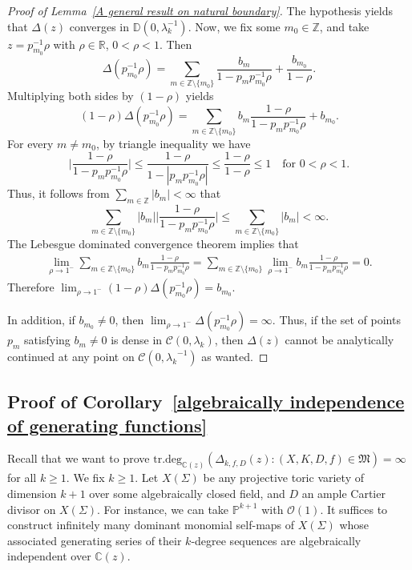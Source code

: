 \documentclass[11pt,a4paper]{article}
\theoremstyle{plain}
\theoremstyle{remark}
\theoremstyle{custombold}
\begin{document}
\begin{proof}[Proof of Lemma~\ref{A general result on natural boundary}]
   The hypothesis yields that $\Delta(z)$ converges in $\mathbb D(0,\lambda_k^{-1})$. Now, we fix some $m_0\in\mathbb Z$, and take $z= p_{m_0}^{-1}\rho$ with $\rho\in\mathbb R$, $0<\rho<1$. Then 
$$\Delta(p_{m_0}^{-1}\rho)=\sum_{m\in\mathbb Z\setminus\{m_0\}}\frac{b_m}{1-p_mp_{m_0}^{-1}\rho}+\frac{b_{m_0}}{1-\rho}.$$
Multiplying both sides by $(1-\rho)$ yields
$$(1-\rho)\Delta(p_{m_0}^{-1}\rho)=\sum_{m\in\mathbb Z\setminus\{m_0\}}{b_m}\frac{1-\rho}{1-p_mp_{m_0}^{-1}\rho}+b_{m_0}.$$
For every $m\neq m_0$, by triangle inequality we have $$\Bigg|\frac{1-\rho}{1-p_mp_{m_0}^{-1}\rho}\Bigg|\leq \frac{1-\rho}{1-|p_mp_{m_0}^{-1}\rho|}\leq\frac{1-\rho}{1-\rho}\leq 1\text{ }\text{ for }0<\rho<1.$$
Thus, it follows from $\sum_{m\in\mathbb Z}|b_m|<\infty$ that 
$$\sum_{m\in\mathbb Z\setminus\{m_0\}}{|b_m|}\Bigg|\frac{1-\rho}{1-p_mp_{m_0}^{-1}\rho}\Bigg|\leq \sum_{m\in\mathbb Z\setminus\{m_0\}}|b_m|<\infty.$$
The Lebesgue dominated convergence theorem implies that \begin{align*}
    \lim_{\rho\to 1^-}\sum_{m\in\mathbb Z\setminus\{m_0\}}{b_m}\frac{1-\rho}{1-p_mp_{m_0}^{-1}\rho}=\sum_{m\in\mathbb Z\setminus\{m_0\}}\lim_{\rho\to1^-}{b_m}\frac{1-\rho}{1-p_mp_{m_0}^{-1}\rho}=0.
\end{align*}
Therefore 
$\lim_{\rho\to 1^-}(1-\rho)\Delta(p_{m_0}^{-1}\rho)=b_{m_0}.$

In addition, if $b_{m_0}\neq0$, then $\lim_{\rho\to 1^-}\Delta(p_{m_0}^{-1}\rho)=\infty$. Thus, if the set of points $p_m$ satisfying $b_m\neq0$ is dense in $\mathcal{C}(0,\lambda_k)$, then $\Delta(z)$ cannot be
analytically continued at any point on $\mathcal{C}(0,{\lambda_k}^{-1})$ as wanted.

\end{proof}

\subsection{Proof of Corollary~\ref{algebraically independence of generating functions}}


Recall that we want to prove $\mathrm{tr.deg}_{\mathbb C(z)}(\Delta_{k,f,D}(z):(X,K,D,f)\in \mathfrak M)=\infty$ for all $k\geq1$. We fix $k\geq1$. Let $X(\Sigma)$ be any projective toric variety of dimension $k+1$ over some algebraically closed field, and $D$ an ample Cartier divisor on $X(\Sigma)$. For instance, we can take $\mathbb P^{k+1}$ with $\mathcal{O}(1)$. It suffices to construct infinitely many dominant monomial self-maps of $X(\Sigma)$ whose associated generating series of their $k$-degree sequences are algebraically independent over $\mathbb C(z)$. 
\end{document}
